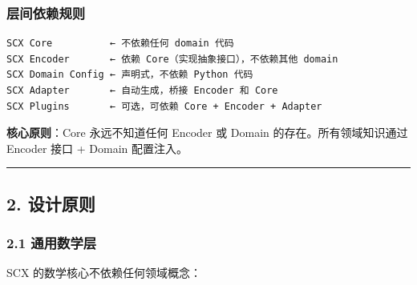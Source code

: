 \documentclass[
  12pt,
]{ctexart}
\begin{document}
\subsubsection{层间依赖规则}\label{ux5c42ux95f4ux4f9dux8d56ux89c4ux5219}

\begin{verbatim}
SCX Core          ← 不依赖任何 domain 代码
SCX Encoder       ← 依赖 Core（实现抽象接口），不依赖其他 domain
SCX Domain Config ← 声明式，不依赖 Python 代码
SCX Adapter       ← 自动生成，桥接 Encoder 和 Core
SCX Plugins       ← 可选，可依赖 Core + Encoder + Adapter
\end{verbatim}

\textbf{核心原则}：Core 永远不知道任何 Encoder 或 Domain
的存在。所有领域知识通过 Encoder 接口 + Domain 配置注入。

\begin{center}\rule{0.5\linewidth}{0.5pt}\end{center}

\subsection{2. 设计原则}\label{ux8bbeux8ba1ux539fux5219}

\subsubsection{2.1 通用数学层}\label{ux901aux7528ux6570ux5b66ux5c42}

SCX 的数学核心不依赖任何领域概念：
\end{document}
